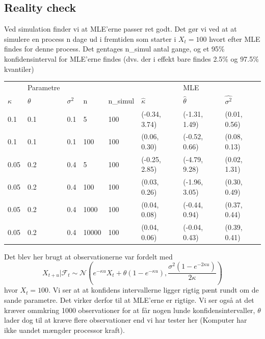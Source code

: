 \documentclass{article}
\theoremstyle{definition}
\theoremstyle{remark}
\begin{document}
\subsection{Reality check}
Ved simulation finder vi at MLE'erne passer ret godt. Det gør vi ved at at simulere en process n dage ud i fremtiden som starter i $X_t=100$  hvort efter MLE findes for denne process. Det gentages n\_simul antal gange, og et 95\% konfidensinterval for MLE'erne findes (dvs. der i effekt bare findes 2.5\% og 97.5\% kvantiler) 
\begin{center}
\begin{tabular}{llllllll}
 &Parametre&& &&& MLE  \\
 $\kappa$&$\theta$&$\sigma^2$&n&n\_simul&$\hat \kappa$&$\hat\theta$&$\hat{\sigma^2}$ \\
 0.1 & 0.1 & 0.1 & 5& 100 & (-0.34, 3.74)&(-1.31, 1.49)&(0.01, 0.56)\\
 0.1 & 0.1 & 0.1 & 100& 100 & (0.06, 0.30)&(-0.52, 0.66)&(0.08, 0.13)\\
 0.05&0.2&0.4&5&100&(-0.25, 2.85)&(-4.79, 9.28)&(0.02, 1.31)\\
 0.05&0.2&0.4&100&100&(0.03, 0.26)&(-1.96, 3.05)&(0.30, 0.49)\\
 0.05&0.2&0.4&1000&100&(0.04, 0.08)&(-0.44, 0.94)&(0.37, 0.44)\\
 0.05&0.2&0.4&10000&100&(0.04, 0.06)&(-0.04, 0.43)&(0.39, 0.41)
\end{tabular}
\end{center}
Det blev her brugt at observationerne var fordelt med 
$$X_{t+u}|\mathcal F_t\sim\mathcal N\left(e^{-\kappa u}X_t + \theta(1-e^{-\kappa u}),\frac{\sigma^2 (1-e^{-2\kappa u})}{2\kappa}\right)$$ hvor $X_t=100$. Vi ser at at konfidens intervallerne ligger rigtig pænt rundt om de sande parametre. Det virker derfor til at MLE'erne er rigtige. Vi ser også at det kræver ommkring 1000 observationer for at får nogen lunde konfidensintervaller, $\theta$ lader dog til at kræve flere observationer end vi har tester her (Komputer har ikke uandet mængder processor kraft). 
\end{document}
